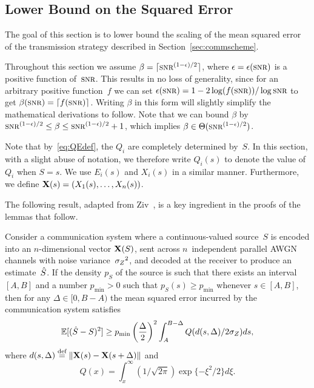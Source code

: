 \subsection{Lower Bound on the Squared Error}\label{sec:scalarlowerbound}

The goal of this section is to lower bound the scaling of the mean squared error
of the transmission strategy described in Section~\ref{sec:commscheme}.

Throughout this section we assume $\beta = \lceil \snr^{(1-\e)/2}\rceil$, where
$\e = \e(\snr)$ is a positive function of~$\snr$. This results in no
loss of generality, since for an arbitrary positive function~$f$ we can set
$\e(\snr) = 1-2 \log(f(\snr))/\log\snr$ to get $\beta(\snr) = \lceil f(\snr)
\rceil$.  Writing $\beta$ in this form will slightly simplify the mathematical
derivations to follow. Note that we can bound $\beta$ by $\snr^{(1-\e)/2} \le
\beta \le \snr^{(1-\e)/2} + 1$, which implies $\beta \in
\Theta(\snr^{(1-\e)/2})$.

Note that by~\eqref{eq:QEdef}, the $Q_i$ are completely determined by~$S$.
In this section, with a slight abuse of notation, we therefore write $Q_i(s)$ to
denote the value of~$Q_i$ when $S = s$. We use $E_i(s)$ and $X_i(s)$ in a
similar manner. Furthermore, we define $\mathbf{X}(s) = (X_1(s), \dots, X_n(s))$.

The following result, adapted from Ziv~\cite{Ziv1970}, is a key ingredient in
the proofs of the lemmas that follow.

\begin{lemma}
  \label{lem:zivbound}
  Consider a communication system where a con\-tin\-u\-ous-valued source~$S$ is
  encoded into an $n$-dimensional vector $\mathbf{X}(S)$, sent across $n$~independent
  parallel AWGN channels with noise variance~${{\sigma_Z}^2}$, and decoded at the receiver
  to produce an estimate~${\hat{S}}$.  If the density $p_S$ of the source is such that
  there exists an interval $[A,B]$ and a number $p_{\min} > 0$ such that $p_S(s)
  \ge p_{\min}$ whenever $s \in [A,B]$, then for any $\Delta \in [0,B-A)$ the
  mean squared error incurred by the communication system satisfies
  \begin{equation}
    \label{eq:zivbound}
    \mathbb{E}[({\hat{S}} - S)^2] \ge p_{\min} \left(\frac{\Delta}{2} \right)^2 
    \int_A^{B-\Delta} Q(d(s, \Delta) / 2 {\sigma_Z}) ds,
  \end{equation}
  where $d(s, \Delta) \stackrel{\text{def}}{=} \|\mathbf{X}(s) - \mathbf{X}(s+\Delta)\|$ and 
  \[Q(x) = \int_x^{\infty} (1/\sqrt{2\pi}) \exp\{-\xi^2/2\} d\xi.\]
\end{lemma}

